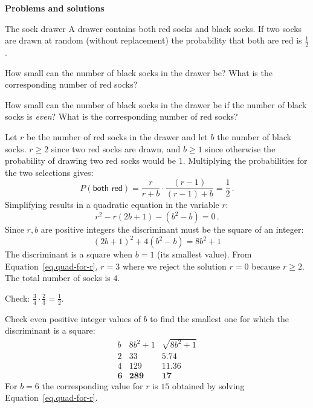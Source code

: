 

\begin{center}
\textbf{\LARGE Problems and solutions}
\end{center}


\begin{prob}{The sock drawer}
A drawer contains both red socks and black socks. If two socks are drawn at random (without replacement) the probability that both are red is $\frac{1}{2}$. 

 How small can the number of black socks in the drawer be? What is the corresponding number of red socks?

 How small can the number of black socks in the drawer be if the number of black socks is \emph{even}? What is the corresponding number of red socks?
\end{prob}


 Let $r$ be the number of red socks in the drawer and let $b$ the number of black socks.  $r\geq 2$ since two red socks are drawn, and $b\geq 1$ since otherwise the probability of drawing two red socks would be $1$. Multiplying the probabilities for the two selections gives:
\begin{equation}\label{eq.1-a}
P(\textsf{both red})=\frac{r}{r+b} \cdot \frac{(r-1)}{(r-1)+b} = \frac{1}{2}\,.
\end{equation}
Simplifying results in a quadratic equation in the variable $r$:
\begin{equation}\label{eq.quad-for-r}
r^2-r(2b+1)-(b^2-b)=0\,.
\end{equation}
Since $r,b$ are positive integers the discriminant must be the square of an integer:
\begin{equation}\label{eq.discriminant}
(2b+1)^2+4(b^2-b)=8b^2+1
\end{equation}
The discriminant is a square when $b=1$ (its smallest value). From Equation~\ref{eq.quad-for-r}, $r=3$ where we reject the solution $r=0$ because $r\geq 2$. The total number of socks is $4$.

Check: $\frac{3}{4}\cdot\frac{2}{3}=\frac{1}{2}$.

\medskip

Check even positive integer values of $b$ to find the smallest one for which the discriminant is a square:
\begin{displaymath}
\renewcommand{\arraystretch}{1}
\begin{array}{r|r|r}
b&8b^2+1&\sqrt{8b^2+1}\\
\hline
2&33&5.74\\
4&129&11.36\\
\mathbf{6}&\mathbf{289}&\mathbf{17}
\end{array}
\end{displaymath}
For $b=6$ the corresponding value for $r$ is $15$ obtained by solving Equation~\ref{eq.quad-for-r}.

